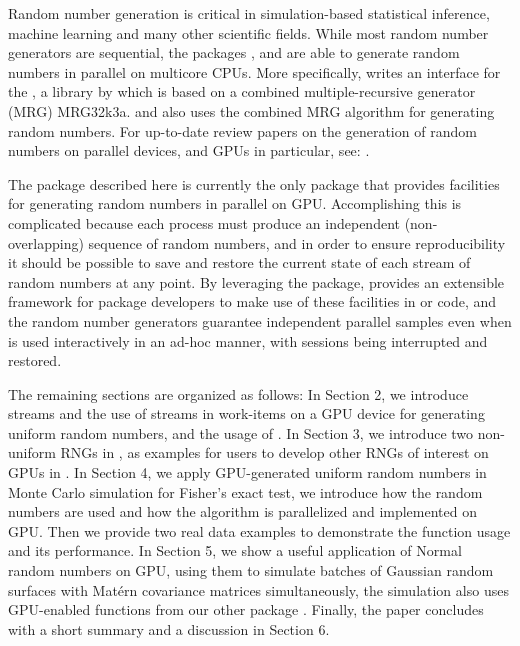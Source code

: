 \documentclass[article,nojss]{jss}\usepackage[]{graphicx}\usepackage[]{color}
\newcommand{\fct}[1]{\code{#1()}}
\begin{document}
Random number generation is critical in simulation-based statistical inference, machine learning and many other scientific fields. While most random number generators are sequential, the  packages ,  \citep*{future1.19.1} and  \citep{sevcikova2015package} are able to generate random numbers in parallel on multicore CPUs. More specifically,  writes an interface for the , a  library by \cite{l2002object} which is based on a combined multiple-recursive generator (MRG) MRG32k3a.  and  also uses the combined MRG algorithm for generating random numbers. For up-to-date review papers on the generation of random numbers on parallel devices, and GPUs in particular, see:  \cite{rLEC15a,rLEC17p,rLEC21a}.


The  package described here is currently the only  package that provides facilities for generating random numbers in parallel on GPU. Accomplishing this is complicated because each process must produce an independent (non-overlapping) sequence of random numbers, and in order to ensure reproducibility it should be possible to save and restore the current state of each stream of random numbers at any point.  By leveraging the  package,  provides an extensible framework for  package developers to make use of these facilities in  or  code, and the random number generators guarantee independent parallel samples even when  is used interactively in an ad-hoc manner, with sessions being interrupted and restored.


The remaining sections are organized as follows:
In Section 2, we introduce streams and the use of streams in work-items on a GPU device for generating uniform random numbers, and the usage of \fct{runifGpu}.
In Section 3, we introduce two non-uniform RNGs in , as examples for users to develop other RNGs of interest on GPUs in .
In Section 4, we apply GPU-generated uniform random numbers in Monte Carlo simulation for Fisher’s exact test, we introduce how the random numbers are used and how the algorithm is parallelized and implemented on GPU. Then we provide two real data examples to demonstrate the function usage and its  performance.
In Section 5, we show a useful application of Normal random numbers on GPU, using them to simulate batches of Gaussian random surfaces with Mat\'ern covariance matrices simultaneously, the simulation also uses GPU-enabled functions from our other package .
Finally, the paper concludes with a short summary and a discussion in Section 6.
\end{document}
